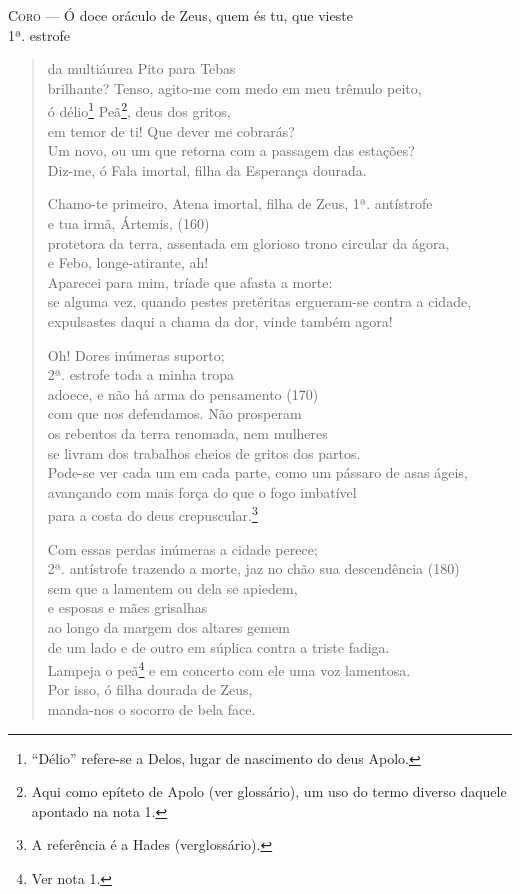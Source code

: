 \textsc{Coro} --- Ó doce oráculo de Zeus, quem és tu, que vieste\\ 1ª. estrofe
\begin{verse}da multiáurea Pito para Tebas\\
brilhante? Tenso, agito-me com medo em meu trêmulo peito,\\
ó délio\footnote{``Délio'' refere-se a Delos, lugar de nascimento do
deus Apolo.} Peã\footnote{Aqui como epíteto de Apolo (ver glossário),
um uso do termo diverso daquele apontado na nota 1.}, deus dos gritos,\\
em temor de ti! Que dever me cobrarás?\\
Um novo, ou um que retorna com a passagem das estações?\\
Diz-me, ó Fala imortal, filha da Esperança dourada.

Chamo-te primeiro, Atena imortal, filha de Zeus, 1ª. antístrofe\\
e tua irmã, Ártemis, (160)\\
protetora da terra, assentada em glorioso trono circular da ágora,\\
e Febo, longe-atirante, ah!\\
Aparecei para mim, tríade que afasta a morte:\\
se alguma vez, quando pestes pretéritas ergueram-se contra a cidade,\\
expulsastes daqui a chama da dor, vinde também agora!

Oh! Dores inúmeras suporto;\\ 2ª. estrofe
toda a minha tropa\\
adoece, e não há arma do pensamento (170)\\
com que nos defendamos. Não prosperam\\
os rebentos da terra renomada, nem mulheres\\
se livram dos trabalhos cheios de gritos dos partos.\\
Pode-se ver cada um em cada parte, como um pássaro de asas ágeis,\\
avançando com mais força do que o fogo imbatível\\
para a costa do deus crepuscular.\footnote{A referência é a Hades (verglossário).}

Com essas perdas inúmeras a cidade perece;\\ 2ª. antístrofe
trazendo a morte, jaz no chão sua descendência (180)\\
sem que a lamentem ou dela se apiedem,\\
e esposas e mães grisalhas\\
ao longo da margem dos altares gemem\\
de um lado e de outro em súplica contra a triste fadiga.\\
Lampeja o peã\footnote{Ver nota 1.} e em concerto com ele uma voz lamentosa.\\
Por isso, ó filha dourada de Zeus,\\
manda-nos o socorro de bela face.


\end{verse}

